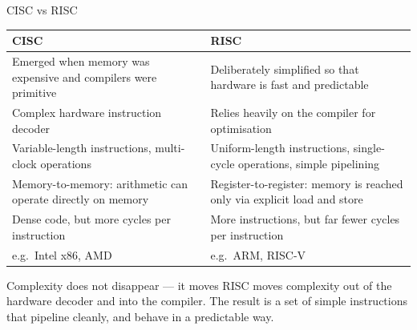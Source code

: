 \documentclass[9pt,aspectratio=169,xcolor=table]{beamer}
\begin{document}
\begin{frame}{CISC vs RISC}
    \begin{center}
    \striped
    \begin{tabular}{p{}p{}}
        \toprule
        \textbf{CISC} & \textbf{RISC} \\
        \midrule
        Emerged when memory was expensive and compilers were primitive & Deliberately simplified so that hardware is fast and \alert{predictable} \\
        Complex hardware instruction decoder & Relies heavily on the compiler for optimisation \\
        Variable-length instructions, multi-clock operations & Uniform-length instructions, single-cycle operations, simple pipelining \\
        \alert{Memory-to-memory}: arithmetic can operate directly on memory & \alert{Register-to-register}: memory is reached only via explicit load and store \\
        Dense code, but more cycles per instruction & More instructions, but far fewer cycles per instruction \\
        e.g.\ Intel x86, AMD & e.g.\ ARM, RISC-V \\
        \bottomrule
    \end{tabular}
    \end{center}
    \vspace{1.5mm}
    \begin{block}{Complexity does not disappear --- it moves}
        RISC moves complexity out of the hardware decoder and into the compiler. The result is a set of simple instructions that pipeline cleanly, and behave in a predictable way.
    \end{block}
\end{frame}
\end{document}
